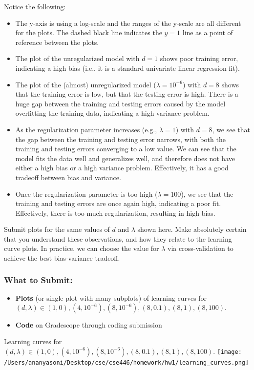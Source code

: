 \documentclass{article}
\begin{document}
\begin{aprob}
    Notice the following:
    \begin{itemize}
        \item The y-axis is using a log-scale and the ranges of the y-scale are all different for the plots.  The dashed black line indicates the $y=1$ line as a point of reference between the plots.
        \item The plot of the unregularized model with $d = 1$ shows poor training error, indicating a high bias (i.e., it is a standard univariate linear regression fit).
        \item The plot of the (almost) unregularized model ($\lambda = 10^{-6}$) with $d = 8$ shows that the training error is low, but that the testing error is high.  There is a huge gap between the training and testing errors caused by the model overfitting the training data, indicating a high variance problem.
        \item As the regularization parameter increases (e.g., $\lambda = 1$) with $d = 8$, we see that the gap between the training and testing error narrows, with both the training and testing errors converging to a low value.  We can see that the model fits the data well and generalizes well, and therefore does not have either a high bias or a high variance problem.  Effectively, it has a good tradeoff between bias and variance.
        \item Once the regularization parameter is too high ($\lambda = 100$), we see that the training and testing errors are once again high, indicating a poor fit.  Effectively, there is too much regularization, resulting in high bias.
    \end{itemize}
    
    Submit plots for the same values of $d$ and $\lambda$ shown here. Make absolutely certain that you understand these observations, and how they relate to the learning curve plots.  In practice, we can choose the value for $\lambda$ via cross-validation to achieve the best bias-variance tradeoff.
    
    \subsubsection*{What to Submit:}
    \begin{itemize}
        \item \textbf{Plots} (or single plot with many subplots) of learning curves for $(d, \lambda) \in {(1, 0), (4,10^{-6}), (8, 10^{-6}), (8, 0.1), (8, 1), (8, 100)}$.
        \item \textbf{Code} on Gradescope through coding submission
    \end{itemize}
    \begin{tcolorbox}[colback=lightgray!10!white, colframe=black, title=A4]
        \begin{center}
            Learning curves for $(d, \lambda) \in {(1, 0), (4,10^{-6}), (8, 10^{-6}), (8, 0.1), (8, 1), (8, 100)}$.
            \texttt{[image: /Users/ananyasoni/Desktop/cse/cse446/homework/hw1/learning\_curves.png]}
        \end{center}
    \end{tcolorbox}
\end{aprob}
\end{document}
